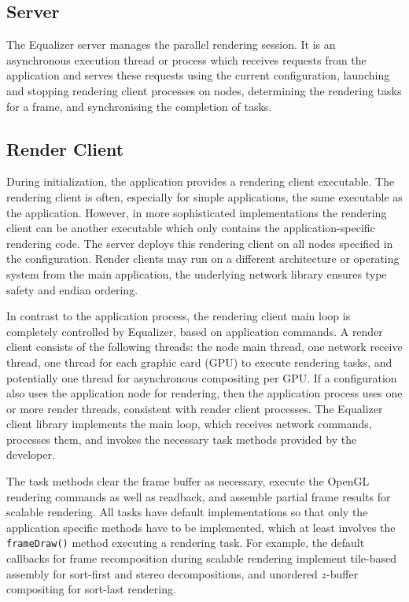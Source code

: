 \subsection{Server}

The Equalizer server manages the parallel rendering session. It is an
asynchronous execution thread or process which receives requests from the
application and serves these requests using the current configuration, launching
and stopping rendering client processes on nodes, determining the rendering
tasks for a frame, and synchronising the completion of tasks.

\subsection{Render Client}

During initialization, the application provides a rendering client executable.
The rendering client is often, especially for simple applications, the same
executable as the application. However, in more sophisticated implementations
the rendering client can be another executable which only contains the
application-specific rendering code. The server deploys this rendering client
on all nodes specified in the configuration. Render clients may run on a
different architecture or operating system from the main application, the
underlying network library ensures type safety and endian ordering.

In contrast to the application process, the rendering client main loop is
completely controlled by Equalizer, based on application commands. A render
client consists of the following threads: the node main thread, one network
receive thread, one thread for each graphic card (GPU) to execute rendering
tasks, and potentially one thread for asynchronous compositing per GPU. If a
configuration also uses the application node for rendering, then the
application process uses one or more render threads, consistent with render
client processes. The Equalizer client library implements the main loop, which
receives network commands, processes them, and invokes the necessary task
methods provided by the developer.

The task methods clear the frame buffer as necessary, execute the OpenGL
rendering commands as well as readback, and assemble partial frame results for
scalable rendering. All tasks have default implementations so that only the
application specific methods have to be implemented, which at least involves
the {\tt frameDraw()} method executing a rendering task. For example, the
default callbacks for frame recomposition during scalable rendering implement
tile-based assembly for sort-first and stereo decompositions, and unordered
$z$-buffer compositing for sort-last rendering.

